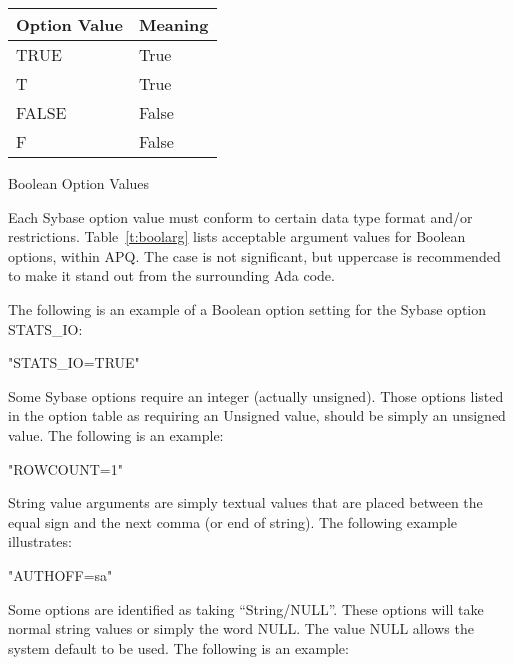 \documentclass[english,letterpaper]{book}
\begin{document}
\begin{floatingtable}{
   \begin{tabular}{ll}
   Option Value   &  Meaning\\
   \hline 
   TRUE           &  True\\
   T              &  True\\
   FALSE          &  False\\
   F              &  False\\
   \end{tabular}}
   \caption{Boolean Option Values}\label{t:boolarg}
\end{floatingtable}

Each Sybase option value must conform to certain data type format
and/or restrictions. Table~\ref{t:boolarg} lists
acceptable argument values for Boolean options, within APQ. The
case is not significant, but uppercase is recommended to make it stand out from
the surrounding Ada code.

The following is an example of a Boolean option setting for the Sybase option STATS\_IO:

\begin{Example}

   "STATS_IO=TRUE"

\end{Example}

Some Sybase options require an integer (actually unsigned). Those
options listed in the option table as requiring an Unsigned value,
should be simply an unsigned value. The following is an example:

\begin{Example}

   "ROWCOUNT=1"

\end{Example}

String value arguments are simply textual values that are placed between
the equal sign and the next comma (or end of string). The following
example illustrates:

\begin{Example}

   "AUTHOFF=sa"

\end{Example}

Some options are identified as taking ``String/NULL''. These options
will take normal string values or simply the word NULL. The value
NULL allows the system default to be used. The following is an example:
\end{document}
